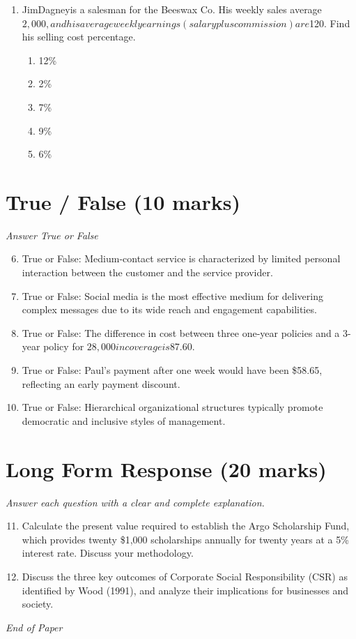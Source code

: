 \documentclass[12pt]{article}
\begin{document}
\begin{enumerate}[label=\arabic*.]
\begin{enumerate}[label=(\alph*)]
    \item \$2,000
    \item \$750
    \item \$1,500
\end{enumerate}
\item JimDagneyis a salesman for the Beeswax Co. His weekly sales average $2,000, and his average weekly earnings (salary plus commission) are $120. Find his selling cost percentage.
\begin{enumerate}[label=(\alph*)]
    \item 12\%
    \item 2\%
    \item 7\%
    \item 9\%
    \item 6\%
\end{enumerate}
\end{enumerate}

\section*{True / False (10 marks)}
\textit{Answer True or False}
\begin{enumerate}[label=\arabic*.]
\setcounter{enumi}{5}
\item True or False: Medium-contact service is characterized by limited personal interaction between the customer and the service provider.
\item True or False: Social media is the most effective medium for delivering complex messages due to its wide reach and engagement capabilities.
\item True or False: The difference in cost between three one-year policies and a 3-year policy for $28,000 in coverage is $87.60.
\item True or False: Paul's payment after one week would have been \$58.65, reflecting an early payment discount.
\item True or False: Hierarchical organizational structures typically promote democratic and inclusive styles of management.
\end{enumerate}

\section*{Long Form Response (20 marks)}
\textit{Answer each question with a clear and complete explanation.}
\begin{enumerate}[label=\arabic*.]
\setcounter{enumi}{10}
\item Calculate the present value required to establish the Argo Scholarship Fund, which provides twenty \$1,000 scholarships annually for twenty years at a 5\% interest rate. Discuss your methodology.
\item Discuss the three key outcomes of Corporate Social Responsibility (CSR) as identified by Wood (1991), and analyze their implications for businesses and society.
\end{enumerate}

\vfill
\noindent\textit{End of Paper}
\end{document}
